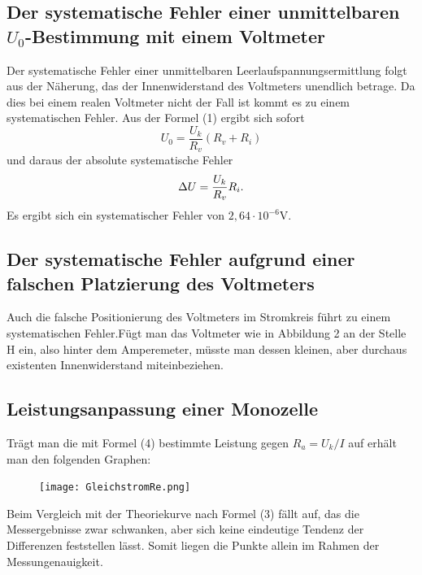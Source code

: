 \subsection{Der systematische Fehler einer unmittelbaren $U_0$-Bestimmung mit einem Voltmeter}
Der systematische Fehler einer unmittelbaren Leerlaufspannungsermittlung folgt aus der Näherung, das
der Innenwiderstand des Voltmeters unendlich betrage. Da dies bei einem realen Voltmeter nicht der
Fall ist kommt es zu einem systematischen Fehler.
Aus der Formel (1) ergibt sich sofort
\begin{equation}
U_0 = \frac{U_k}{R_v}(R_v + R_i)
\end{equation}
und daraus der absolute systematische Fehler
\begin{equation}
\Delta U = \frac{U_k}{R_v}R_i \text.
\end{equation}
Es ergibt sich ein systematischer Fehler von $2,64 \cdot 10^{-6} $V.





\subsection{Der systematische Fehler aufgrund einer falschen Platzierung des Voltmeters}
Auch die falsche Positionierung des Voltmeters im Stromkreis führt zu einem
systematischen Fehler.Fügt man das Voltmeter wie in Abbildung 2 an der Stelle H
ein, also hinter dem Amperemeter, müsste man dessen kleinen, aber durchaus existenten
Innenwiderstand miteinbeziehen.

\newpage
\subsection{Leistungsanpassung einer Monozelle}
Trägt man die mit Formel (4) bestimmte Leistung gegen $R_a = U_k/I$ auf erhält man
den folgenden Graphen:
\begin{figure}[H]
	\centering
	\caption{}
	\texttt{[image: GleichstromRe.png]}
	\label{fig:GleichstromLeistung}
\end{figure}
Beim Vergleich mit der Theoriekurve nach Formel (3) fällt auf, das die Messergebnisse zwar schwanken, aber sich keine eindeutige Tendenz der Differenzen feststellen lässt. Somit liegen die Punkte allein im Rahmen der Messungenauigkeit.
